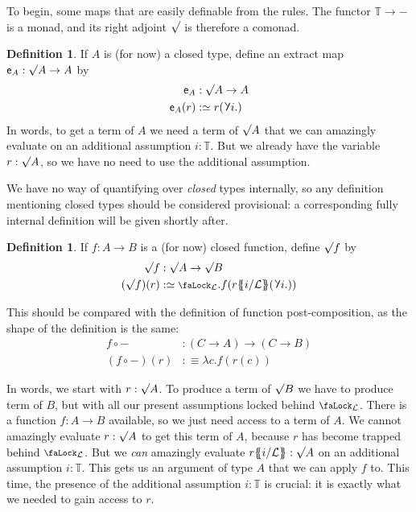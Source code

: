 \documentclass[10pt]{article}
\theoremstyle{definition}
\newtheorem{definition}[theorem]{Definition}
\let\oldequiv\equiv%
\renewcommand{\equiv}{\simeq}
\newcommand{\defeq}{\oldequiv}
\newcommand{\lock}{\mathchoice {\scalebox{0.8}{\text{\faLock}}}
  {\scalebox{0.8}{\text{\faLock}}} {\scalebox{0.5}{\text{\faLock}}}
  {\scalebox{0.4}{\text{\faLock}}} }
\newcommand{\rbindsym}{%
  \mathchoice
    {\reflectbox{\rotatebox[origin=c]{185}{$\lambda$}}}  %
    {\reflectbox{\rotatebox[origin=c]{185}{$\lambda$}}}  %
    {\reflectbox{\rotatebox[origin=c]{185}{$\scriptstyle\lambda$}}}  %
    {\reflectbox{\rotatebox[origin=c]{185}{$\scriptscriptstyle\lambda$}}}  %
  }
\newcommand{\rbind}[1]{\rbindsym{} #1.}
\newcommand{\Tiny}{\mathbb{T}}
\newcommand{\lockn}[1]{\mathcal{#1}}
\newcommand{\ctxlocke}[1]{\lock_{#1}}
\newcommand{\ctxlock}[1]{\ctxlocke{\lockn{#1}}}
\newcommand{\stubra}[1]{\{\!\!\{ #1 \}\!\!\}}
\newcommand{\substuck}[2]{\stubra{#1/\lockn{#2}}}
\newcommand{\rformsym}{\surd}
\newcommand{\rformu}[1]{\ThisStyle{\raisebox{0.07em}{$\SavedStyle \rformsym$}} #1}
\newcommand{\rintroe}[2]{\lock_{#1}. #2}
\newcommand{\rintro}[2]{\rintroe{\lockn{#1}}{#2}}
\newcommand{\extract}{\mathsf{e}}
\begin{document}
To begin, some maps that are easily definable from the rules. The
functor $\Tiny \to -$ is a monad, and its right adjoint $\rformu{}$ is
therefore a comonad.

\begin{definition}
  If $A$ is (for now) a closed type, define an 
  extract map $\extract_A : \rformu{A} \to A$ by
  \begin{align*}
    \extract_A &: \rformu{A} \to A \\
    \extract_A(r) &:\defeq r(\rbind{i})
  \end{align*}
  In words, to get a term of $A$ we need a term of $\rformu{A}$ that
  we can amazingly evaluate on an additional assumption $i : \Tiny$.
  But we already have the variable $r : \rformu{A}$, so we have no
  need to use the additional assumption.
\end{definition}

We have no way of quantifying over \emph{closed} types internally, so
any definition mentioning closed types should be considered
provisional: a corresponding fully internal definition will be given
shortly after.

\begin{definition}
  If $f : A \to B$ is a (for now) closed function, define $\rformu f$ by
  \begin{align*}
    \rformu f &: \rformu A \to \rformu B \\
    (\rformu f)(r) &:\defeq \rintro{L}{f(r\substuck{i}{L}(\rbind{i}))}
  \end{align*}
\end{definition}

This should be compared with the definition of function
post-composition, as the shape of the definition is the same:
\begin{align*}
  f \circ - &: (C \to A) \to (C \to B) \\
  (f \circ -)(r) &:\defeq \lambda c. f(r(c))
\end{align*}

In words, we start with $r : \rformu A$. To produce a term of
$\rformu B$ we have to produce term of $B$, but with all our present
assumptions locked behind $\ctxlock{L}$. There is a function
$f : A \to B$ available, so we just need access to a term of $A$. We
cannot amazingly evaluate $r : \rformu A$ to get this term of $A$,
because $r$ has become trapped behind $\ctxlock{L}$. But we \emph{can}
amazingly evaluate $r\substuck{i}{L} : \rformu A$ on an additional
assumption $i : \Tiny$. This gets us an argument of type $A$ that we
can apply $f$ to. This time, the presence of the additional assumption
$i : \Tiny$ is crucial: it is exactly what we needed to gain access
to $r$.
\end{document}
